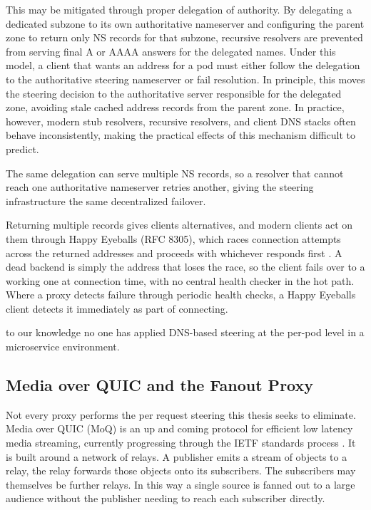 \documentclass[a4paper,11pt]{article}
\begin{document}
This may be mitigated through proper delegation of authority. By delegating a dedicated subzone to its own authoritative 
nameserver and configuring the parent zone to return only NS records for that subzone, recursive resolvers are prevented 
from serving final A or AAAA answers for the delegated names. Under this model, a client that wants an address for a pod 
must either follow the delegation to the authoritative steering nameserver or fail resolution. 
In principle, this moves the steering decision to the authoritative server responsible for the delegated zone, 
avoiding stale cached address records from the parent zone. In practice, however, modern stub resolvers, recursive resolvers, 
and client DNS stacks often behave inconsistently,
making the practical effects of this mechanism difficult to predict.

The same delegation can serve multiple NS records, 
so a resolver that cannot reach one authoritative nameserver retries another, 
giving the steering infrastructure the same decentralized failover.

Returning multiple records gives clients alternatives, and modern clients act on them through Happy Eyeballs (RFC 8305), 
which races connection attempts across the returned addresses and proceeds with whichever responds first \cite{schinaziHappyEyeballsVersion2017a}.
A dead backend is simply the address that loses the race, so the client fails over to a working one at connection time, 
with no central health checker in the hot path. Where a proxy detects failure through periodic health checks, 
a Happy Eyeballs client detects it immediately as part of connecting.

to our knowledge no one has applied DNS-based steering at the per-pod level in a microservice environment.

\subsection{Media over QUIC and the Fanout Proxy}

Not every proxy performs the per request steering this thesis seeks to eliminate. Media over QUIC (MoQ)
is an up and coming protocol for efficient low latency media streaming, currently progressing through
the IETF standards process \cite{nandakumarMediaQUICTransport2026}. It is built around a network of relays.
A publisher emits a stream of objects to a relay, the relay forwards those objects onto its subscribers.
The subscribers may themselves be further relays. In this way a single source is fanned out to a large audience
without the publisher needing to reach each subscriber directly.
\end{document}
